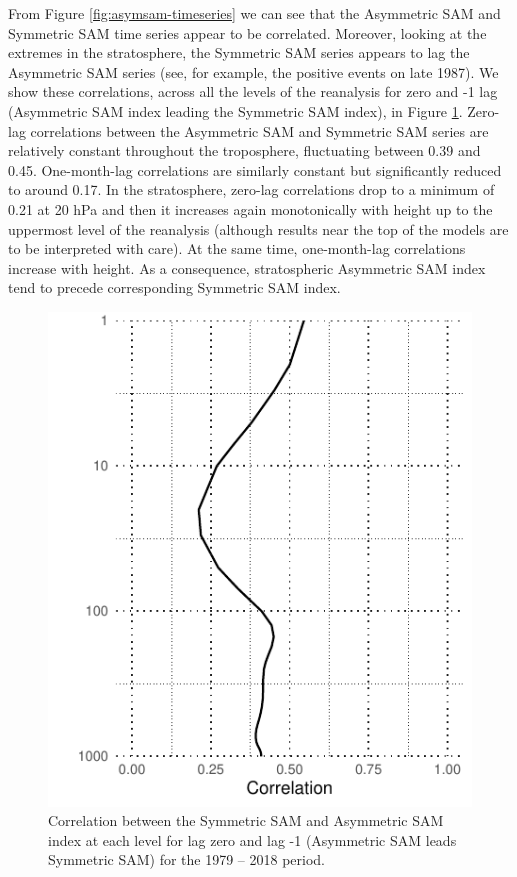 \documentclass[smallextended]{svjour3}       %
\begin{document}
From Figure \ref{fig:asymsam-timeseries} we can see that the Asymmetric SAM and Symmetric SAM time series appear to be correlated. Moreover, looking at the extremes in the stratosphere, the Symmetric SAM series appears to lag the Asymmetric SAM series (see, for example, the positive events on late 1987). We show these correlations, across all the levels of the reanalysis for zero and -1 lag (Asymmetric SAM index leading the Symmetric SAM index), in Figure \ref{fig:cor-lev}. Zero-lag correlations between the Asymmetric SAM and Symmetric SAM series are relatively constant throughout the troposphere, fluctuating between 0.39 and 0.45. One-month-lag correlations are similarly constant but significantly reduced to around 0.17. In the stratosphere, zero-lag correlations drop to a minimum of 0.21 at 20 hPa and then it increases again monotonically with height up to the uppermost level of the reanalysis (although results near the top of the models are to be interpreted with care). At the same time, one-month-lag correlations increase with height. As a consequence, stratospheric Asymmetric SAM index tend to precede corresponding Symmetric SAM index.

\begin{figure}
\includegraphics{figures/cor-lev-1} \caption{Correlation between the Symmetric SAM and Asymmetric SAM index at each level for lag zero and lag -1 (Asymmetric SAM leads Symmetric SAM) for the 1979 -- 2018 period.}\label{fig:cor-lev}
\end{figure}
\end{document}
